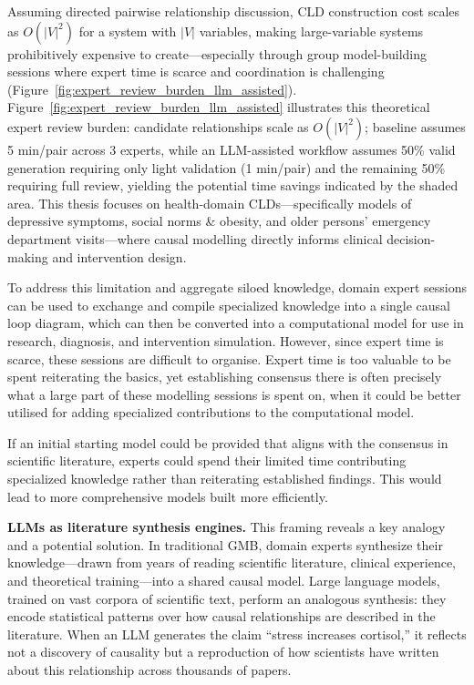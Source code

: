 Assuming directed pairwise relationship discussion, CLD construction cost scales as $O(|V|^2)$ for a system with $|V|$ variables, making large-variable systems prohibitively expensive to create---especially through group model-building sessions where expert time is scarce and coordination is challenging (Figure~\ref{fig:expert_review_burden_llm_assisted}). Figure~\ref{fig:expert_review_burden_llm_assisted} illustrates this theoretical expert review burden: candidate relationships scale as $O(|V|^2)$; baseline assumes 5 min/pair across 3 experts, while an LLM-assisted workflow assumes 50\% valid generation requiring only light validation (1 min/pair) and the remaining 50\% requiring full review, yielding the potential time savings indicated by the shaded area. This thesis focuses on health-domain CLDs---specifically models of depressive symptoms, social norms \& obesity, and older persons' emergency department visits---where causal modelling directly informs clinical decision-making and intervention design.

To address this limitation and aggregate siloed knowledge, domain expert sessions can be used to exchange and compile specialized knowledge into a single causal loop diagram, which can then be converted into a computational model for use in research, diagnosis, and intervention simulation. However, since expert time is scarce, these sessions are difficult to organise. Expert time is too valuable to be spent reiterating the basics, yet establishing consensus there is often precisely what a large part of these modelling sessions is spent on, when it could be better utilised for adding specialized contributions to the computational model.

If an initial starting model could be provided that aligns with the consensus in scientific literature, experts could spend their limited time contributing specialized knowledge rather than reiterating established findings. This would lead to more comprehensive models built more efficiently.

\medskip
\noindent
\textbf{LLMs as literature synthesis engines.} This framing reveals a key analogy and a potential solution. In traditional GMB, domain experts synthesize their knowledge---drawn from years of reading scientific literature, clinical experience, and theoretical training---into a shared causal model. Large language models, trained on vast corpora of scientific text, perform an analogous synthesis: they encode statistical patterns over how causal relationships are described in the literature. When an LLM generates the claim ``stress increases cortisol,'' it reflects not a discovery of causality but a reproduction of how scientists have written about this relationship across thousands of papers.

